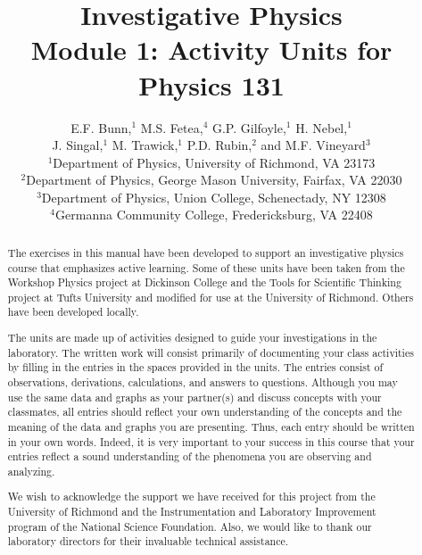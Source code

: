 

\title{Investigative Physics\\ Module 1: Activity Units for Physics 131}


\author{E.F. Bunn,$^1$ M.S. Fetea,$^4$ G.P. Gilfoyle,$^1$ H. Nebel,$^1$ \\J. Singal,$^1$ M. Trawick,$^1$ P.D. Rubin,$^2$ and M.F. Vineyard$^3$\\[4pt]
$^1$Department of Physics, University of Richmond, VA 23173 \\[4pt]
$^2$Department of Physics, George Mason University, Fairfax, VA  22030 \\[4pt]
$^3$Department of Physics, Union College, Schenectady, NY 12308 \\[4pt]
$^4$Germanna Community College, Fredericksburg, VA 22408}

\maketitle
\begin{abstract}
The exercises in this manual have been developed to support an investigative
physics course that emphasizes active learning. Some of these units have been
taken from the Workshop Physics project at Dickinson College and the Tools for
Scientific Thinking project at Tufts University and modified for use at the
University of Richmond. Others have been developed locally.

The units are made up of activities designed to guide your investigations in
the laboratory. The written work will consist primarily of documenting your
class activities by filling in the entries in the spaces provided in the units.
The entries consist of observations, derivations, calculations, and answers
to questions. Although you may use the same data and graphs as your partner(s)
and discuss concepts with your classmates, all entries should reflect your own
understanding of the concepts and the meaning of the data and graphs you are
presenting. Thus, each entry should be written in your own words. Indeed, it
is very important to your success in this course that your entries reflect a
sound understanding of the phenomena you are observing and analyzing.

We wish to acknowledge the support we have received for this project from the
University of Richmond and the Instrumentation and Laboratory Improvement program of the National Science Foundation. Also, we would like to thank our laboratory directors for their invaluable technical assistance.
\end{abstract}


